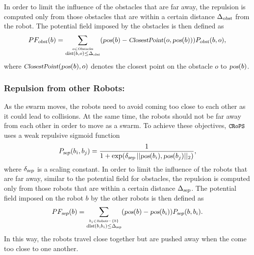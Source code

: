 \documentclass{llncs}
\newcommand{\Acronym}[1]{\ensuremath{{\small{\texttt{#1}}}}}
\newcommand{\Var}[1]{\ensuremath{{\small{\textsl{#1}}}}}
\newcommand{\Name}{\Acronym{CRoPS}}
\begin{document}

In order to limit the influence of the obstacles that are far away,
the repulsion is computed only from those obstacles that are within a
certain distance $\Delta_\Var{obst}$ from the robot. The potential
field imposed by the obstacles is then defined as 
$$
PF_\Var{obst}(b) = \sum_{\stackrel{o \in
    \Var{Obstacles}}{\Var{dist}(b, o) \leq \Delta_\Var{obst}}} (\Var{pos}(b)
- \Var{ClosestPoint}(o, \Var{pos}(b))) P_\Var{obst}(b, o),
$$
where $\Var{ClosestPoint}(\Var{pos}(b), o)$ denotes the closest point on the
obstacle $o$ to $\Var{pos}(b)$.

\subsubsection{Repulsion from other Robots:}
\label{sec:PFrobots} As the swarm moves,
the robots need to avoid coming too close to each other as it
could lead to collisions. At the same time, the robots should not be
far away from each other in order to move as a swarm. To achieve these
objectives, $\Name$ uses a weak repulsive sigmoid function
$$
P_\Var{sep}(b_i, b_j) = \frac{1}{1 +
  \exp(\delta_\Var{sep}\, ||\Var{pos}(b_i), \Var{pos}(b_j)||_2)},
$$
where $\delta_\Var{sep}$ is a scaling constant.
In order to limit the influence of the robots that are far away,
similar to the potential field for obstacles,
the repulsion is computed only from those robots that are within a
certain distance $\Delta_\Var{sep}$. The potential
field imposed on the robot $b$ by the other robots is then defined as 
$$
PF_\Var{sep}(b) = \sum_{\stackrel{b_i \in
    \Var{Robots} - \{b\}}{\Var{dist}(b, b_i) \leq \Delta_\Var{sep}}} (\Var{pos}(b)
- \Var{pos}(b_i)) P_\Var{sep}(b, b_i).
$$
In this way, the robots travel close together but are
pushed away when the come too close to one another.
\end{document}
